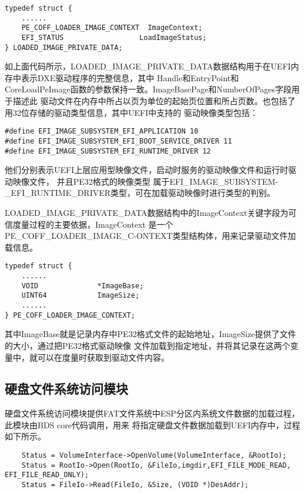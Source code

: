 \begin{lstlisting}
typedef struct {
    ......
    PE_COFF_LOADER_IMAGE_CONTEXT  ImageContext; 
    EFI_STATUS                  LoadImageStatus;
} LOADED_IMAGE_PRIVATE_DATA;
\end{lstlisting}

如上面代码所示，LOADED\_IMAGE\_PRIVATE\_DATA数据结构用于在UEFI内存中表示DXE驱动程序的完整信息，其中
Handle和EntryPoint和CoreLoadPeImage函数的参数保持一致。ImageBasePage和NumberOfPages字段用于描述此
驱动文件在内存中所占以页为单位的起始页位置和所占页数。也包括了用32位存储的驱动类型信息，其中UEFI中支持的
驱动映像类型包括：

\begin{lstlisting}
#define EFI_IMAGE_SUBSYSTEM_EFI_APPLICATION 10
#define EFI_IMAGE_SUBSYSTEM_EFI_BOOT_SERVICE_DRIVER 11
#define EFI_IMAGE_SUBSYSTEM_EFI_RUNTIME_DRIVER 12
\end{lstlisting}

他们分别表示UEFI上层应用型映像文件，启动时服务的驱动映像文件和运\newline 行时驱动映像文件，
并且PE32格式的映像类型
属于EFI\_IMAGE\_SUBSYSTEM-\newline \_EFI\_RUNTIME\_DRIVER类型，可在加载驱动映像时进行类型的判别。
\par LOADED\_IMAGE\_PRIVATE\_DATA数据结构中的ImageContext关键字段为可信度量过程的主要依据，ImageContext
是一个PE\_COFF\_LOADER\_IMAGE\_C-\newline ONTEXT类型结构体，用来记录驱动文件加载信息。

\begin{lstlisting}
typedef struct {
    ......
    VOID              *ImageBase;
    UINT64            ImageSize;
    ......
} PE_COFF_LOADER_IMAGE_CONTEXT;
\end{lstlisting}

其中ImageBase就是记录内存中PE32格式文件的起始地址，ImageSize提供了文件的大小，通过把PE32格式驱动映像
文件加载到指定地址，并将其记录在这两个变量中，就可以在度量时获取到驱动文件内容。

\subsection{硬盘文件系统访问模块}
硬盘文件系统访问模块提供FAT文件系统中ESP分区内系统文件数据的加载过程，此模块由BDS core代码调用，用来
将指定硬盘文件数据加载到UEFI内存中，过程如下所示。

\begin{lstlisting}
    Status = VolumeInterface->OpenVolume(VolumeInterface, &RootIo);
    Status = RootIo->Open(RootIo, &FileIo,imgdir,EFI_FILE_MODE_READ, EFI_FILE_READ_ONLY);
    Status = FileIo->Read(FileIo, &Size, (VOID *)DesAddr);
\end{lstlisting}

